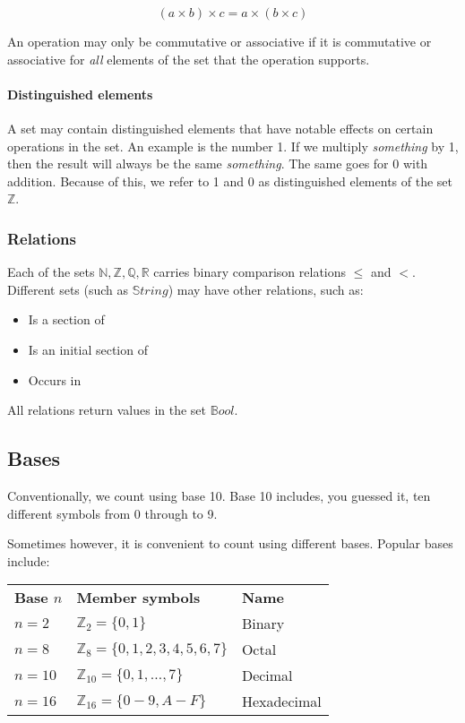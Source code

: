 \begin{dmath*}
	(a \times b) \times c = a \times (b \times c)
\end{dmath*}

An operation may only be commutative or associative if it is commutative or
associative for {\it all} elements of the set that the operation supports.

\paragraph{Distinguished elements}

A set may contain distinguished elements that have notable effects on certain
operations in the set. An example is the number 1. If we multiply {\it
something} by 1, then the result will always be the same {\it something}. The
same goes for 0 with addition. Because of this, we refer to 1 and 0 as
distinguished elements of the set $\mathbb{Z}$.

\subsubsection{Relations}

Each of the sets $\mathbb{N, Z, Q, R}$ carries binary comparison relations
$\leq$ and $<$. Different sets (such as $\mathbb{S}tring$) may have other
relations, such as:

\begin{itemize}
	\item Is a section of
	\item Is an initial section of
	\item Occurs in
\end{itemize}

All relations return values in the set $\mathbb{B}ool$.

\subsection{Bases}

Conventionally, we count using base 10. Base 10 includes, you guessed it, ten
different symbols from 0 through to 9.

Sometimes however, it is convenient to count using different bases. Popular
bases include:

\begin{center}
	\begin{tabular}{l l l}
		{\bf Base $n$} & {\bf Member symbols} & {\bf Name}\\
		$n = 2$ & $\mathbb{Z}_2 = \{0, 1\}$ & Binary\\
		$n = 8$ & $\mathbb{Z}_8 = \{0, 1, 2, 3, 4, 5, 6, 7\}$ & Octal\\
		$n = 10$ & $\mathbb{Z}_{10} = \{0, 1, \ldots, 7\}$ & Decimal\\
		$n = 16$ & $\mathbb{Z}_{16} = \{0-9, A-F\}$ & Hexadecimal\\
	\end{tabular}
\end{center}

